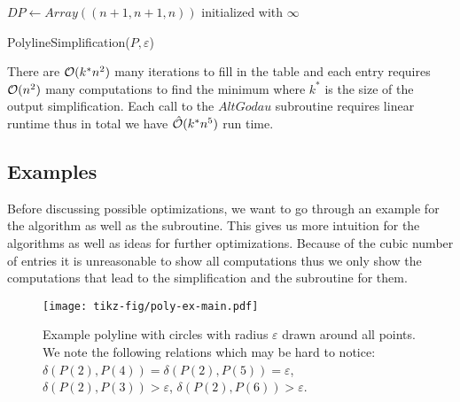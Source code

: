 \begin{algorithm}[ht]
  \DontPrintSemicolon
  \BlankLine
  \(DP \gets Array((n + 1, n + 1, n))\) initialized with \(\infty\) \;
  \caption{PolylineSimplification(\(P, \varepsilon\))}
  \label{algo:simplify_simple}
\end{algorithm}

There are \(\mathcal{O}(k^* n^2)\) many iterations to fill in the table and each entry requires \(\mathcal{O}(n^2)\) many computations to find the minimum where \(k^*\) is the size of the output simplification. Each call to the \(AltGodau\) subroutine requires linear runtime thus in total we have \(\hat{\mathcal{O}}(k^*n^5)\) run time.

\subsection{Examples}
Before discussing possible optimizations, we want to go through an example for the algorithm as well as the \citeauthor{computing_the_frechet_distance_between_two_polygonal_curves} subroutine. This gives us more intuition for the algorithms as well as ideas for further optimizations. Because of the cubic number of entries it is unreasonable to show all computations thus we only show the computations that lead to the simplification and the subroutine for them. 

\begin{figure}
  \centering
  \texttt{[image: tikz-fig/poly-ex-main.pdf]}
  \caption{Example polyline with circles with radius \(\varepsilon\) drawn around all points. We note the following relations which may be hard to notice: \(\delta(P(2), P(4)) = \delta(P(2), P(5)) = \varepsilon\), \(\delta(P(2), P(3)) > \varepsilon\), \(\delta(P(2), P(6)) > \varepsilon\).}
  \label{fig:poly-ex-main}
\end{figure}

